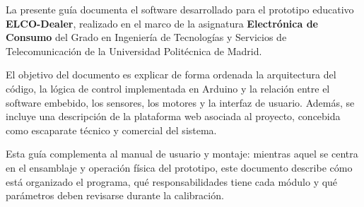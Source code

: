La presente guía documenta el software desarrollado para el prototipo educativo \textbf{ELCO-Dealer}, realizado en el marco de la asignatura \textbf{Electrónica de Consumo} del Grado en Ingeniería de Tecnologías y Servicios de Telecomunicación de la Universidad Politécnica de Madrid.

El objetivo del documento es explicar de forma ordenada la arquitectura del código, la lógica de control implementada en Arduino y la relación entre el software embebido, los sensores, los motores y la interfaz de usuario. Además, se incluye una descripción de la plataforma web asociada al proyecto, concebida como escaparate técnico y comercial del sistema.

Esta guía complementa al manual de usuario y montaje: mientras aquel se centra en el ensamblaje y operación física del prototipo, este documento describe cómo está organizado el programa, qué responsabilidades tiene cada módulo y qué parámetros deben revisarse durante la calibración.
